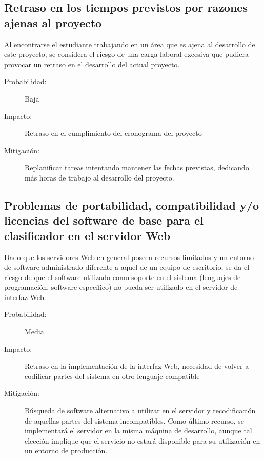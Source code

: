 \documentclass[12pt,bibliography=oldstyle,DIV=12,parskip=half-]{scrreprt}
\begin{document}
\subsection{Retraso en los tiempos previstos por razones ajenas al proyecto}
Al encontrarse el estudiante trabajando en un área que es ajena al
desarrollo de este proyecto, se considera el riesgo de una carga
laboral excesiva que pudiera provocar un retraso en el desarrollo del
actual proyecto.
\begin{description}
  \item[Probabilidad:] Baja
  \item[Impacto:] Retraso en el cumplimiento del cronograma del
    proyecto
  \item[Mitigación:] Replanificar tareas intentando mantener las
    fechas previstas, dedicando más horas de trabajo al desarrollo del
    proyecto.
\end{description}
%
\subsection{Problemas de portabilidad, compatibilidad y/o
  licencias del software de base para el clasificador en el servidor Web}
Dado que los servidores Web en general poseen recursos limitados y un
entorno de software administrado diferente a aquel de un equipo de
escritorio, se da el riesgo de que el software utilizado como soporte
en el sistema (lenguajes de programación, software específico) no
pueda ser utilizado en el servidor de interfaz Web.
\begin{description}
  \item[Probabilidad:] Media
  \item[Impacto:] Retraso en la implementación de la interfaz Web,
    necesidad de volver a codificar partes del sistema en otro
    lenguaje compatible
  \item[Mitigación:] Búsqueda de software alternativo a utilizar en el
    servidor y recodificación de aquellas partes del sistema
    incompatibles. Como último recurso, se implementará el servidor en
    la misma máquina de desarrollo, aunque tal elección implique que
    el servicio no estará disponible para su utilización en un entorno
    de producción.
\end{description}
%
%
\end{document}

